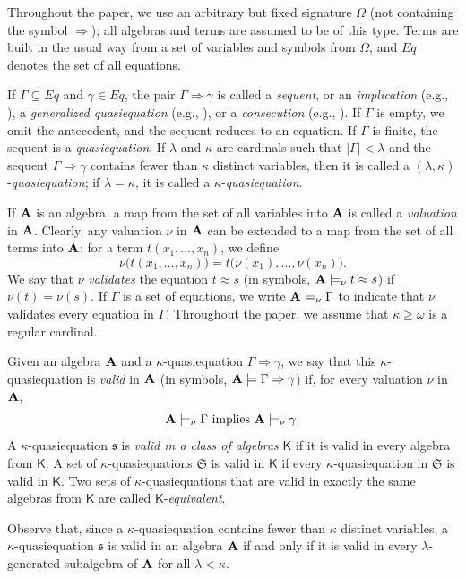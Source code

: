 \documentclass[submission,copyright,creativecommons]{eptcs}
\theoremstyle{definition}
\newcommand{\alg}[1]{{{\textbf{\upshape #1}}}}
\newcommand{\vv}[1]{\mathsf {#1}}
\newcommand{\Def}[1]{\textit{#1}}
\newcommand{\app}{\approx}
\newcommand{\GG}{\Gamma}
\newcommand{\gm}{\gamma}
\newcommand{\kk}{\kappa}
\newcommand{\lm}{\lambda}
\newcommand{\Ra}{\Rightarrow}
\newcommand{\sq}{\mathfrak{s}}
\newcommand{\Sq}{\mathfrak{S}}
\begin{document}
Throughout the paper, we use an arbitrary but fixed signature $\Omega$ (not containing the symbol $\Ra$); all algebras and terms are assumed to be of this type. Terms are built in the usual way from a set of variables and symbols from $\Omega$, and $Eq$ denotes the set of all equations.

If $\GG \subseteq Eq$ and $\gm \in Eq$, the pair $\GG \Ra \gm$ is called a \Def{sequent}, or an \Def{implication} (e.g., \cite{ShafaatImplicationally1969}), a \Def{generalized quasiequation} (e.g., \cite{MoraschiniLogical2018}), or a \Def{consecution} (e.g., \cite{LavickaNogueraNew2017}). If $\GG$ is empty, we omit the antecedent, and the sequent reduces to an equation. If $\GG$ is finite, the sequent is a \Def{quasiequation}. If $\lm$ and $\kk$ are cardinals such that $|\GG| < \lm$ and the sequent $\GG \Ra \gm$ contains fewer than $\kk$ distinct variables, then it is called a $(\lm,\kk)$-\Def{quasiequation}; if $\lm = \kk$, it is called a $\kk$-\Def{quasiequation}.

If $\alg A$ is an algebra, a map from the set of all variables into $\alg A$ is called a \Def{valuation} in $\alg A$. Clearly, any valuation $\nu$ in $\alg A$ can be extended to a map from the set of all terms into $\alg A$: for a term $t(x_1,\dots,x_n)$, we define
\[
\nu\bigl(t(x_1,\dots,x_n)\bigr) = t\bigl(\nu(x_1),\dots,\nu(x_n)\bigr).
\]
We say that $\nu$ \Def{validates} the equation $t \app s$ (in symbols, $\alg A \models_\nu t \app s$) if $\nu(t) = \nu(s)$. If $\GG$ is a set of equations, we write $\alg A \models_\nu \GG$ to indicate that $\nu$ validates every equation in $\GG$. Throughout the paper, we assume that $\kk \ge \omega$ is a regular cardinal.

Given an algebra $\alg A$ and a $\kk$-quasiequation $\GG \Ra \gm$, we say that this $\kk$-quasiequation is \Def{valid} in $\alg A$ (in symbols, $\alg A \models \GG \Ra \gm$) if, for every valuation $\nu$ in $\alg A$,
\begin{align*}
	\alg A \models_\nu \GG \ \text{implies} \ \alg A \models_\nu \gm.
\end{align*}
A $\kk$-quasiequation $\sq$ is \Def{valid in a class of algebras} $\vv K$ if it is valid in every algebra from $\vv K$. A set of $\kk$-quasiequations $\Sq$ is valid in $\vv K$ if every $\kk$-quasiequation in $\Sq$ is valid in $\vv K$. Two sets of $\kk$-quasiequations that are valid in exactly the same algebras from $\vv K$ are called $\vv K$-\Def{equivalent}.

Observe that, since a $\kk$-quasiequation contains fewer than $\kk$ distinct variables, a $\kk$-quasiequation $\sq$ is valid in an algebra $\alg A$ if and only if it is valid in every $\lm$-generated subalgebra of $\alg A$ for all $\lm < \kk$.
\smallskip
\end{document}
